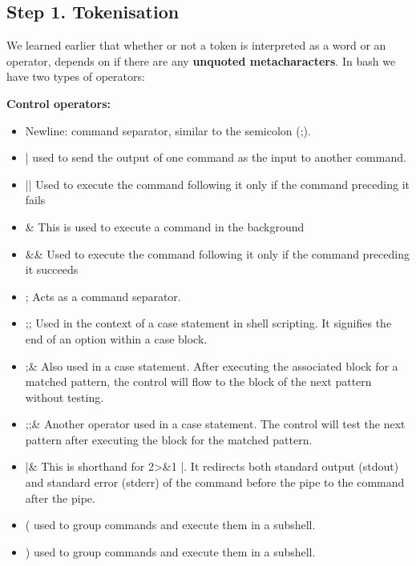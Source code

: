 \documentclass{report}
\begin{document}
    \subsection{Step 1. Tokenisation}
    \bigbreak \noindent 
    We learned earlier that whether or not a token is interpreted as a word or an operator, depends on if there are any \textbf{unquoted metacharacters}. In bash we have two types of operators:
    \bigbreak \noindent 
    \begin{minipage}[t]{0.5\textwidth}
    \textbf{Control operators:}
    \begin{itemize}
        \item Newline: command separator, similar to the semicolon (;).
        \item | used to send the output of one command as the input to another command.
        \item || Used to execute the command following it only if the command preceding it fails 
        \item \& This is used to execute a command in the background
        \item \&\& Used to execute the command following it only if the command preceding it succeeds 
        \item ; Acts as a command separator.
        \item ;; Used in the context of a case statement in shell scripting. It signifies the end of an option within a case block.
        \item ;\& Also used in a case statement. After executing the associated block for a matched pattern, the control will flow to the block of the next pattern without testing.
        \item ;;\& Another operator used in a case statement. The control will test the next pattern after executing the block for the matched pattern.
        \item |\& This is shorthand for 2>&1 |. It redirects both standard output (stdout) and standard error (stderr) of the command before the pipe to the command after the pipe.
        \item ( used to group commands and execute them in a subshell. 
        \item ) used to group commands and execute them in a subshell. 
    \end{itemize}
   \end{minipage}
\end{document}
